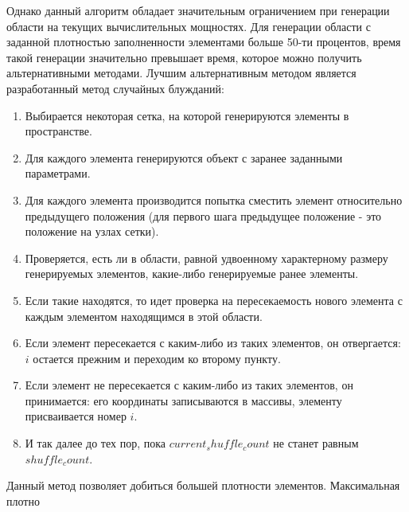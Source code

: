 Однако данный алгоритм обладает значительным ограничением при генерации области на текущих вычислительных мощностях. Для генерации области с заданной плотностью заполненности элементами больше 50-ти процентов, время такой генерации значительно превышает время, которое можно получить альтернативными методами. Лучшим альтернативным методом является разработанный метод случайных блужданий:
\begin{enumerate}
    \item Выбирается некоторая сетка, на которой генерируются элементы в пространстве.
    \item Для каждого элемента генерируются объект с заранее заданными параметрами.
    \item Для каждого элемента производится попытка сместить элемент относительно предыдущего положения (для первого шага предыдущее положение - это положение на узлах сетки).
    \item Проверяется, есть ли в области, равной удвоенному характерному размеру генерируемых элементов, какие-либо генерируемые ранее элементы.
    \item Если такие находятся, то идет проверка на пересекаемость нового элемента с каждым элементом находящимся в этой области.
    \item Если элемент пересекается с каким-либо из таких элементов, он отвергается: $i$ остается прежним и переходим ко второму пункту.
    \item Если элемент не пересекается с каким-либо из таких элементов, он принимается: его координаты записываются в массивы, элементу присваивается номер $i$.
    \item И так далее до тех пор, пока $current_shuffle_count$ не станет равным $shuffle_count$. 
\end{enumerate}
Данный метод позволяет добиться большей плотности элементов. Максимальная плотно